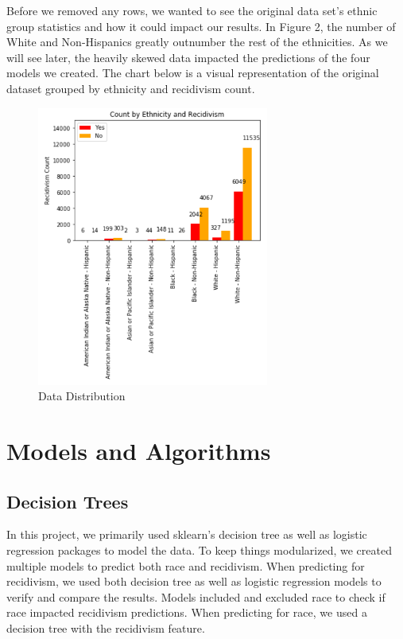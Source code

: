 \documentclass[11pt, sigconf]{acmart}
\begin{document}
Before we removed any rows, we wanted to see the original data set's ethnic group statistics and how it could impact our results. In Figure 2, the number of White and Non-Hispanics greatly outnumber the rest of the ethnicities. As we will see later, the heavily skewed data impacted the predictions of the four models we created. The chart below is a visual representation of the original dataset grouped by ethnicity and recidivism count. 

\begin{figure}[h] 	
\centering
\includegraphics[width=3in]{1.png}
\caption{Data Distribution}
\end{figure}

\section{Models and Algorithms}
\subsection{Decision Trees}
\hspace{5mm} In this project, we primarily used sklearn’s decision tree as well as logistic regression packages to model the data. To keep things modularized, we created multiple models to predict both race and recidivism. When predicting for recidivism, we used both decision tree as well as logistic regression models to verify and compare the results. Models included and excluded race to check if race impacted recidivism predictions. When predicting for race, we used a decision tree with the recidivism feature.
\end{document}
